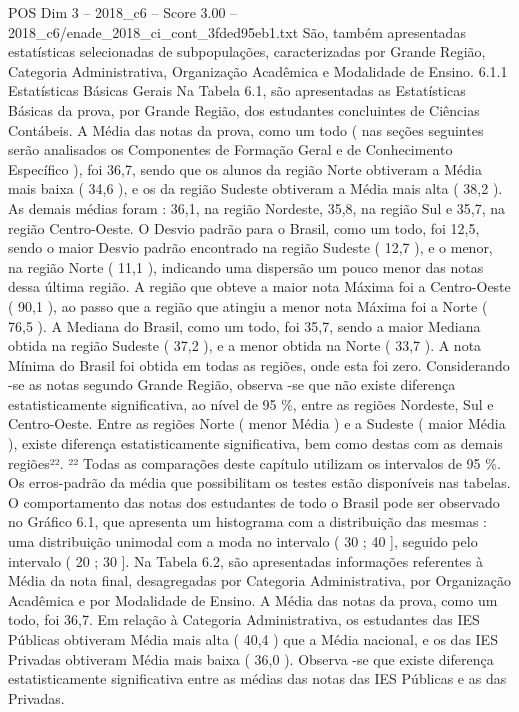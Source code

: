 \begin{textsample}{POS Dim 3 – 2018\_c6 – Score 3.00 – 2018\_c6/enade\_2018\_ci\_cont\_3fded95eb1.txt}
São, também apresentadas estatísticas selecionadas de subpopulações, caracterizadas por Grande Região, Categoria Administrativa, Organização Acadêmica e Modalidade de Ensino. 6.1.1 Estatísticas Básicas Gerais Na Tabela 6.1, são apresentadas as Estatísticas Básicas da prova, por Grande Região, dos estudantes concluintes de Ciências Contábeis.
A Média das notas da prova, como um todo ( nas seções seguintes serão analisados os Componentes de Formação Geral e de Conhecimento Específico ), foi 36,7, sendo que os alunos da região Norte obtiveram a Média mais baixa ( 34,6 ), e os da região Sudeste obtiveram a Média mais alta ( 38,2 ).
As demais médias foram : 36,1, na região Nordeste, 35,8, na região Sul e 35,7, na região Centro-Oeste.
O Desvio padrão para o Brasil, como um todo, foi 12,5, sendo o maior Desvio padrão encontrado na região Sudeste ( 12,7 ), e o menor, na região Norte ( 11,1 ), indicando uma dispersão um pouco menor das notas dessa última região.
A região que obteve a maior nota Máxima foi a Centro-Oeste ( 90,1 ), ao passo que a região que atingiu a menor nota Máxima foi a Norte ( 76,5 ).
A Mediana do Brasil, como um todo, foi 35,7, sendo a maior Mediana obtida na região Sudeste ( 37,2 ), e a menor obtida na Norte ( 33,7 ).
A nota Mínima do Brasil foi obtida em todas as regiões, onde esta foi zero.
Considerando -se as notas segundo Grande Região, observa -se que não existe diferença estatisticamente significativa, ao nível de 95 \%, entre as regiões Nordeste, Sul e Centro-Oeste.
Entre as regiões Norte ( menor Média ) e a Sudeste ( maior Média ), existe diferença estatisticamente significativa, bem como destas com as demais regiões²². ²² Todas as comparações deste capítulo utilizam os intervalos de 95 \%.
Os erros-padrão da média que possibilitam os testes estão disponíveis nas tabelas.
O comportamento das notas dos estudantes de todo o Brasil pode ser observado no Gráfico 6.1, que apresenta um histograma com a distribuição das mesmas : uma distribuição unimodal com a moda no intervalo ( 30 ; 40 ], seguido pelo intervalo ( 20 ; 30 ].
Na Tabela 6.2, são apresentadas informações referentes à Média da nota final, desagregadas por Categoria Administrativa, por Organização Acadêmica e por Modalidade de Ensino.
A Média das notas da prova, como um todo, foi 36,7.
Em relação à Categoria Administrativa, os estudantes das IES Públicas obtiveram Média mais alta ( 40,4 ) que a Média nacional, e os das IES Privadas obtiveram Média mais baixa ( 36,0 ).
Observa -se que existe diferença estatisticamente significativa entre as médias das notas das IES Públicas e as das Privadas.

\end{textsample}
